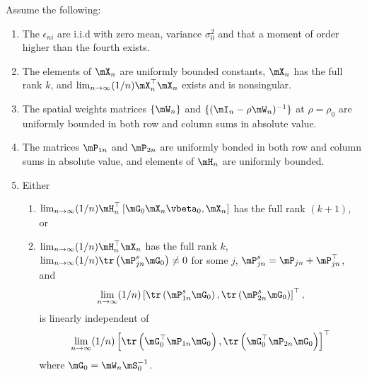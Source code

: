 \documentclass[english,12pt]{book}\usepackage[]{graphicx}\usepackage[]{xcolor}
\begin{document}
\begin{assumption}\label{assumption:lee2007-1}
Assume the following:
\begin{enumerate}
  \item The $\epsilon_{ni}$ are i.i.d with zero mean, variance $\sigma_0^2$ and that a moment of order higher than the fourth exists. 
  \item The elements of $\mX_n$ are uniformly bounded constants, $\mX_n$ has the full rank $k$, and $\lim_{n\to\infty}(1/n)\mX_n^\top\mX_n$ exists and is nonsingular. 
  \item The spatial weights matrices $\{\mW_n\}$ and $\{(\mI_n - \rho\mW_n)^{-1}\}$ at $\rho = \rho_0$ are uniformly bounded in both row and column sums in absolute value.
  \item The matrices $\mP_{1n}$ and $\mP_{2n}$ are uniformly bonded in both row and column sums in absolute value, and elements of $\mH_n$ are uniformly bounded. 
  \item Either 
  \begin{enumerate}
    \item $\lim_{n\to\infty}(1/n)\mH_n^\top\left[\mG_0\mX_n\vbeta_0, \mX_n\right]$ has the full rank $(k + 1)$, or
    \item $\lim_{n\to\infty}(1/n)\mH_n^\top\mX_n$ has the full rank $k$, $\lim_{n\to\infty}(1/n)\tr\left(\mP_{jn}^s\mG_0\right)\neq 0$ for some $j$, $\mP_{jn}^s = \mP_{jn} + \mP_{jn}^\top$, and 
    \begin{equation*}
      \lim_{n\to\infty}(1/n)\left[\tr\left(\mP_{1n}^s\mG_0\right), \tr\left(\mP_{2n}^s\mG_0\right)\right]^\top, 
    \end{equation*}
    is linearly independent of 
    \begin{equation*}
    \begin{aligned}
    \lim_{n\to\infty}(1/n)\left[\tr\left(\mG_0^\top\mP_{1n}\mG_0\right), \tr\left(\mG_0^\top\mP_{2n}\mG_0\right)\right]^\top
    \end{aligned}
    \end{equation*}
  where $\mG_0 = \mW_n\mS_0^{-1}$.
  \end{enumerate}
\end{enumerate}
\end{assumption}
\end{document}
